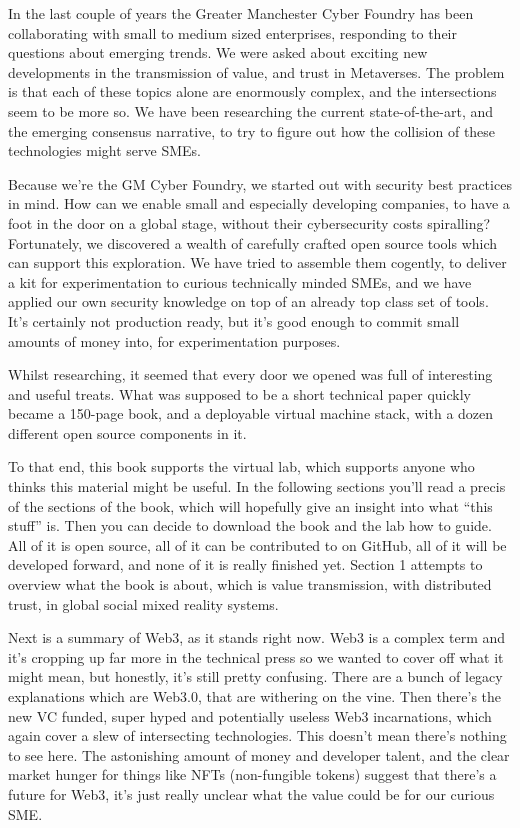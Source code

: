 
In the last couple of years the Greater Manchester Cyber Foundry has been collaborating with small to medium sized enterprises, responding to their questions about emerging trends. We were asked about exciting new developments in the transmission of value, and trust in Metaverses. The problem is that each of these topics alone are enormously complex, and the intersections seem to be more so. We have been researching the current state-of-the-art, and the emerging consensus narrative, to try to figure out how the collision of these technologies might serve SMEs. \par
Because we’re the GM Cyber Foundry, we started out with security best practices in mind. How can we enable small and especially developing companies, to have a foot in the door on a global stage, without their cybersecurity costs spiralling? Fortunately, we discovered a wealth of carefully crafted open source tools which can support this exploration. We have tried to assemble them cogently, to deliver a kit for experimentation to curious technically minded SMEs, and we have applied our own security knowledge on top of an already top class set of tools. It’s certainly not production ready, but it's good enough to commit small amounts of money into, for experimentation purposes.\par
Whilst researching, it seemed that every door we opened was full of interesting and useful treats. What was supposed to be a short technical paper quickly became a 150-page book, and a deployable virtual machine stack, with a dozen different open source components in it. \par
To that end, this book supports the virtual lab, which supports anyone who thinks this material might be useful. In the following sections you’ll read a precis of the sections of the book, which will hopefully give an insight into what ``this stuff'' is. Then you can decide to download the book and the lab how to guide. All of it is open source, all of it can be contributed to on GitHub, all of it will be developed forward, and none of it is really finished yet.
Section 1  attempts to overview what the book is about, which is value transmission, with distributed trust, in global social mixed reality systems. \par
Next is a summary of Web3, as it stands right now. Web3 is a complex term and it’s cropping up far more in the technical press so we wanted to cover off what it might mean, but honestly, it’s still pretty confusing. There are a bunch of legacy explanations which are Web3.0, that are withering on the vine. Then there’s the new VC funded, super hyped and potentially useless Web3 incarnations, which again cover a slew of intersecting technologies. This doesn’t mean there’s nothing to see here. The astonishing amount of money and developer talent, and the clear market hunger for things like NFTs (non-fungible tokens) suggest that there’s a future for Web3, it’s just really unclear what the value could be for our curious SME.\par
